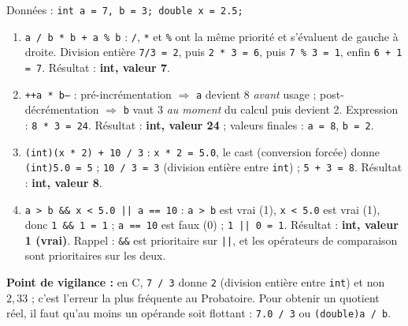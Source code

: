 \documentclass[11pt]{article}
\begin{document}
\begin{corrige}
Données : \texttt{int a = 7, b = 3; double x = 2.5;}

\begin{enumerate}
    \item \texttt{a / b * b + a \% b} : \texttt{/}, \texttt{*} et \texttt{\%} ont la même priorité et s'évaluent de gauche à droite. Division entière \texttt{7/3 = 2}, puis \texttt{2 * 3 = 6}, puis \texttt{7 \% 3 = 1}, enfin \texttt{6 + 1 = 7}. Résultat : \textbf{int, valeur 7}.
    \item \texttt{++a * b--} : pré-incrémentation $\Rightarrow$ \texttt{a} devient 8 \emph{avant} usage ; post-décrémentation $\Rightarrow$ \texttt{b} vaut 3 \emph{au moment} du calcul puis devient 2. Expression : \texttt{8 * 3 = 24}. Résultat : \textbf{int, valeur 24} ; valeurs finales : \texttt{a = 8}, \texttt{b = 2}.
    \item \texttt{(int)(x * 2) + 10 / 3} : \texttt{x * 2 = 5.0}, le cast (conversion forcée) donne \texttt{(int)5.0 = 5} ; \texttt{10 / 3 = 3} (division entière entre \texttt{int}) ; \texttt{5 + 3 = 8}. Résultat : \textbf{int, valeur 8}.
    \item \texttt{a > b \&\& x < 5.0 || a == 10} : \texttt{a > b} est vrai (1), \texttt{x < 5.0} est vrai (1), donc \texttt{1 \&\& 1 = 1} ; \texttt{a == 10} est faux (0) ; \texttt{1 || 0 = 1}. Résultat : \textbf{int, valeur 1 (vrai)}. Rappel : \texttt{\&\&} est prioritaire sur \texttt{||}, et les opérateurs de comparaison sont prioritaires sur les deux.
\end{enumerate}

\textbf{Point de vigilance :} en C, \texttt{7 / 3} donne \texttt{2} (division entière entre \texttt{int}) et non $2,33$ ; c'est l'erreur la plus fréquente au Probatoire. Pour obtenir un quotient réel, il faut qu'au moins un opérande soit flottant : \texttt{7.0 / 3} ou \texttt{(double)a / b}.
\end{corrige}
\end{document}
